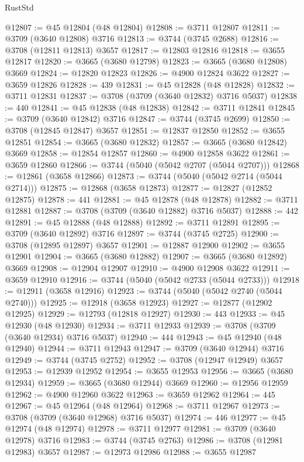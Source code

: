 \begin{lexlean}{RustStd}
\begin{coremodule}
@12807 := @45 @12804 (@48 @12804)
@12808 := @3711 @12807
@12811 := @3709 (@3640 @12808) @3716
@12813 := @3744 (@3745 @2688)
@12816 := @3708 (@12811 @12813) @3657
@12817 := @12803 @12816
@12818 := @3655 @12817
@12820 := @3665 (@3680 @12798)
@12823 := @3665 (@3680 @12808) @3669
@12824 := @12820 @12823
@12826 := @4900 @12824 @3622
@12827 := @3659 @12826
@12828 := 439
@12831 := @45 @12828 (@48 @12828)
@12832 := @3711 @12831
@12837 := @3708 (@3709 (@3640 @12832) @3716 @5037)
@12838 := 440
@12841 := @45 @12838 (@48 @12838)
@12842 := @3711 @12841
@12845 := @3709 (@3640 @12842) @3716
@12847 := @3744 (@3745 @2699)
@12850 := @3708 (@12845 @12847) @3657
@12851 := @12837 @12850
@12852 := @3655 @12851
@12854 := @3665 (@3680 @12832)
@12857 := @3665 (@3680 @12842) @3669
@12858 := @12854 @12857
@12860 := @4900 @12858 @3622
@12861 := @3659 @12860
@12866 := @3744 (@5040 (@5042 @2707 (@5044 @2707)))
@12868 := @12861 (@3658 @12866)
@12873 := @3744 (@5040 (@5042 @2714 (@5044 @2714)))
@12875 := @12868 (@3658 @12873)
@12877 := @12827 (@12852 @12875)
@12878 := 441
@12881 := @45 @12878 (@48 @12878)
@12882 := @3711 @12881
@12887 := @3708 (@3709 (@3640 @12882) @3716 @5037)
@12888 := 442
@12891 := @45 @12888 (@48 @12888)
@12892 := @3711 @12891
@12895 := @3709 (@3640 @12892) @3716
@12897 := @3744 (@3745 @2725)
@12900 := @3708 (@12895 @12897) @3657
@12901 := @12887 @12900
@12902 := @3655 @12901
@12904 := @3665 (@3680 @12882)
@12907 := @3665 (@3680 @12892) @3669
@12908 := @12904 @12907
@12910 := @4900 @12908 @3622
@12911 := @3659 @12910
@12916 := @3744 (@5040 (@5042 @2733 (@5044 @2733)))
@12918 := @12911 (@3658 @12916)
@12923 := @3744 (@5040 (@5042 @2740 (@5044 @2740)))
@12925 := @12918 (@3658 @12923)
@12927 := @12877 (@12902 @12925)
@12929 := @12793 (@12818 @12927)
@12930 := 443
@12933 := @45 @12930 (@48 @12930)
@12934 := @3711 @12933
@12939 := @3708 (@3709 (@3640 @12934) @3716 @5037)
@12940 := 444
@12943 := @45 @12940 (@48 @12940)
@12944 := @3711 @12943
@12947 := @3709 (@3640 @12944) @3716
@12949 := @3744 (@3745 @2752)
@12952 := @3708 (@12947 @12949) @3657
@12953 := @12939 @12952
@12954 := @3655 @12953
@12956 := @3665 (@3680 @12934)
@12959 := @3665 (@3680 @12944) @3669
@12960 := @12956 @12959
@12962 := @4900 @12960 @3622
@12963 := @3659 @12962
@12964 := 445
@12967 := @45 @12964 (@48 @12964)
@12968 := @3711 @12967
@12973 := @3708 (@3709 (@3640 @12968) @3716 @5037)
@12974 := 446
@12977 := @45 @12974 (@48 @12974)
@12978 := @3711 @12977
@12981 := @3709 (@3640 @12978) @3716
@12983 := @3744 (@3745 @2763)
@12986 := @3708 (@12981 @12983) @3657
@12987 := @12973 @12986
@12988 := @3655 @12987

\end{coremodule}
\end{lexlean}
